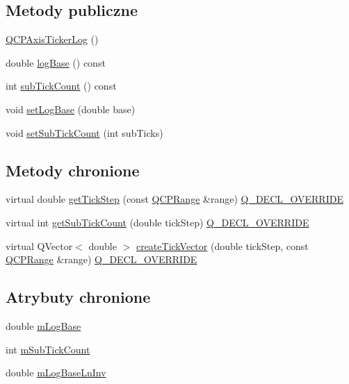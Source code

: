 \subsection*{Metody publiczne}
\begin{DoxyCompactItemize}
\item 
\hyperlink{class_q_c_p_axis_ticker_log_af3cb86ea5eef2023c0b96b5260c4cbdf}{Q\+C\+P\+Axis\+Ticker\+Log} ()
\item 
double \hyperlink{class_q_c_p_axis_ticker_log_abba2a2aead5551b433940fa39a53ca09}{log\+Base} () const 
\item 
int \hyperlink{class_q_c_p_axis_ticker_log_ad7a648bfa6ee3ad33b1c43bd7b84e9ab}{sub\+Tick\+Count} () const 
\item 
void \hyperlink{class_q_c_p_axis_ticker_log_ac6e3b4e03baea3816f898869ab9751ef}{set\+Log\+Base} (double base)
\item 
void \hyperlink{class_q_c_p_axis_ticker_log_ad51989c798c0cfd50936d77aac57c56a}{set\+Sub\+Tick\+Count} (int sub\+Ticks)
\end{DoxyCompactItemize}
\subsection*{Metody chronione}
\begin{DoxyCompactItemize}
\item 
virtual double \hyperlink{class_q_c_p_axis_ticker_log_a57be974214a065d3247406331f02fa49}{get\+Tick\+Step} (const \hyperlink{class_q_c_p_range}{Q\+C\+P\+Range} \&range) \hyperlink{qcustomplot_8hh_a42cc5eaeb25b85f8b52d2a4b94c56f55}{Q\+\_\+\+D\+E\+C\+L\+\_\+\+O\+V\+E\+R\+R\+I\+DE}
\item 
virtual int \hyperlink{class_q_c_p_axis_ticker_log_a352fef7ae68837acd26e35188aa86167}{get\+Sub\+Tick\+Count} (double tick\+Step) \hyperlink{qcustomplot_8hh_a42cc5eaeb25b85f8b52d2a4b94c56f55}{Q\+\_\+\+D\+E\+C\+L\+\_\+\+O\+V\+E\+R\+R\+I\+DE}
\item 
virtual Q\+Vector$<$ double $>$ \hyperlink{class_q_c_p_axis_ticker_log_af8873a8d1d2b9392d8f7a73218c889ab}{create\+Tick\+Vector} (double tick\+Step, const \hyperlink{class_q_c_p_range}{Q\+C\+P\+Range} \&range) \hyperlink{qcustomplot_8hh_a42cc5eaeb25b85f8b52d2a4b94c56f55}{Q\+\_\+\+D\+E\+C\+L\+\_\+\+O\+V\+E\+R\+R\+I\+DE}
\end{DoxyCompactItemize}
\subsection*{Atrybuty chronione}
\begin{DoxyCompactItemize}
\item 
double \hyperlink{class_q_c_p_axis_ticker_log_a4108bcc1cd68dcec54dc75667440d328}{m\+Log\+Base}
\item 
int \hyperlink{class_q_c_p_axis_ticker_log_a3d92b729bedbbbd34ee5f74565defd95}{m\+Sub\+Tick\+Count}
\item 
double \hyperlink{class_q_c_p_axis_ticker_log_aeba719bbeec39957f475ef89d6ae2fe7}{m\+Log\+Base\+Ln\+Inv}
\end{DoxyCompactItemize}
